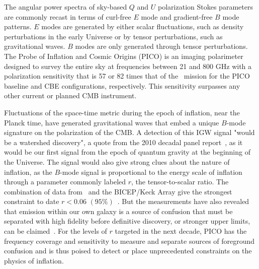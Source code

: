 \documentclass[PICOReport.tex]{subfiles}
\begin{document}

The angular power spectra of sky-based $Q$ and $U$ polarization Stokes parameters are commonly recast in terms of curl-free $E$ mode and gradient-free $B$ mode patterns. $E$ modes are generated by either scalar fluctuations, such as density perturbations in the early Universe or by tensor perturbations, such as gravitational waves. $B$ modes are only generated through tensor perturbations. The Probe of Inflation and Cosmic Origins (PICO) is an imaging polarimeter designed to survey the entire sky at frequencies between 21 and 800 GHz with a polarization sensitivity that is 57 or 82 times that of the \planck\ mission for the PICO baseline and \ac{CBE} configurations, respectively. This sensitivity surpasses any other current or planned CMB instrument. 

Fluctuations of the space-time metric during the epoch of inflation, near the Planck time, have generated gravitational waves that embed a unique $B$-mode signature on the polarization of the CMB. A detection of this \ac{IGW} signal "would be a watershed discovery", a quote from the 2010 decadal panel report~\citep{blandford2010}, as it would be our first signal from the epoch of quantum gravity at the beginning of the Universe. The signal would also give strong clues about the nature of inflation, as the $B$-mode signal is proportional to the energy scale of inflation through a parameter commonly labeled $r$, the tensor-to-scalar ratio. The combination of data from \planck\ and the BICEP/Keck Array give the strongest constraint to date $r<0.06\,\, (95\%)$~\citep{2018arXiv181005216A}.
But the measurements have also revealed that emission within our own galaxy is a source of confusion that must be separated with high fidelity before definitive discovery, or stronger upper limits, can be claimed~\citep{whichplanck}. For the levels of $r$ targeted in the next decade, PICO has the frequency coverage and sensitivity to measure and separate sources of foreground confusion and is thus poised to detect or place unprecedented constraints on the physics of inflation. 
\end{document}
